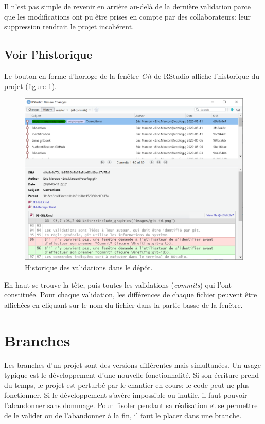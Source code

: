 \documentclass[
  11pt,
  french,
  a4paper,
  extrafontsizes,onecolumn,openright
  ]{memoir}
\begin{document}
Il n'est pas simple de revenir en arrière au-delà de la dernière validation parce que les modifications ont pu être prises en compte par des collaborateurs: leur suppression rendrait le projet incohérent.

\hypertarget{voir-lhistorique}{%
\subsection{Voir l'historique}\label{voir-lhistorique}}

Le bouton en forme d'horloge de la fenêtre \emph{Git} de RStudio affiche l'historique du projet (figure \ref{fig:git-historique}).



\scriptsize

\begin{figure}

{\centering \includegraphics[width=0.8\linewidth]{images/git-historique} 

}

\caption{Historique des validations dans le dépôt.}\label{fig:git-historique}
\end{figure}

\normalsize

En haut se trouve la tête, puis toutes les validations (\emph{commits}) qui l'ont constituée.
Pour chaque validation, les différences de chaque fichier peuvent être affichées en cliquant sur le nom du fichier dans la partie basse de la fenêtre.

\hypertarget{sec:branches}{%
\section{Branches}\label{sec:branches}}

Les branches d'un projet sont des versions différentes mais simultanées.
Un usage typique est le développement d'une nouvelle fonctionnalité.
Si son écriture prend du temps, le projet est perturbé par le chantier en cours: le code peut ne plus fonctionner.
Si le développement s'avère impossible ou inutile, il faut pouvoir l'abandonner sans dommage.
Pour l'isoler pendant sa réalisation et se permettre de le valider ou de l'abandonner à la fin, il faut le placer dans une branche.
\end{document}

